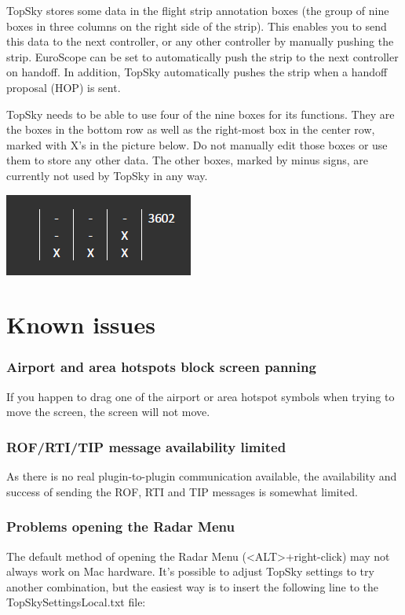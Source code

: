 \documentclass[11pt,a4paper]{memoir}
\begin{document}
TopSky stores some data in the flight strip annotation boxes (the group of nine boxes in three columns on the right side of the strip). This enables you to send this data to the next controller, or any other controller by manually pushing the strip. EuroScope can be set to automatically push the strip to the next controller on handoff. In addition, TopSky automatically pushes the strip when a handoff proposal (HOP) is sent.

TopSky needs to be able to use four of the nine boxes for its functions. They are the boxes in the bottom row as well as the right-most box in the center row, marked with X’s in the picture below. Do not manually edit those boxes or use them to store any other data. The other boxes, marked by minus signs, are currently not used by TopSky in any way.

\includegraphics{img/strip.png}

\chapter{Known issues}

\subsection*{Airport and area hotspots block screen panning}

If you happen to drag one of the airport or area hotspot symbols when trying to move the screen, the screen will not move.

\subsection*{ROF/RTI/TIP message availability limited}

As there is no real plugin-to-plugin communication available, the availability and success of sending the ROF, RTI and TIP messages is somewhat limited.

\subsection*{Problems opening the Radar Menu}

The default method of opening the Radar Menu (<ALT>+right-click) may not always work on Mac hardware. It’s possible to adjust TopSky settings to try another combination, but the easiest way is to insert the following line to the TopSkySettingsLocal.txt file:
\end{document}
